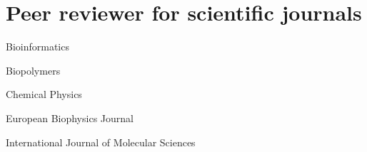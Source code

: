 \documentclass[10pt]{article}
\begin{document}
%

\section*{Peer reviewer for scientific journals}

Bioinformatics

Biopolymers

Chemical Physics

European Biophysics Journal

International Journal of Molecular Sciences
\end{document}
